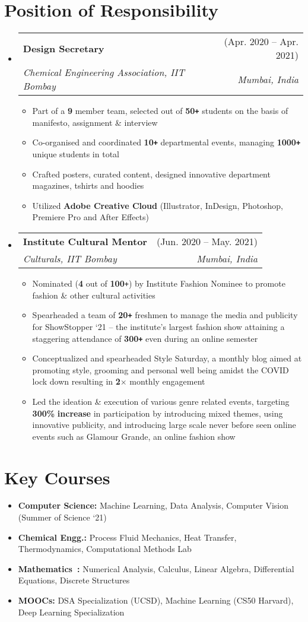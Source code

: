 \documentclass[a4paper,11pt]{article}
\makeatletter
\def\Plus{\texttt{+}}
\newcommand{\techSkill}[2]{\item\small \textbf{#1:} #2 \vspace{-5pt}}
\newcommand{\techSkillListStart}{\begin{itemize}[leftmargin=0.15in, label={}]}
\newcommand{\techSkillListEnd}{\end{itemize}}
\newcommand{\resumeItem}[1]{
  \item\small{
    {#1 \vspace{-2pt}}
  }
}
\newcommand{\resumeSubheading}[4]{
  \vspace{-2pt}\item
    \begin{tabular*}{\textwidth}[t]{l@{\extracolsep{\fill}}r}
      \textbf{#1} & #2 \\
      \textit{\small#3} & \textit{\small #4} \\
    \end{tabular*}\vspace{-7pt}
}
\newcommand{\resumeSubHeadingListStart}{\begin{itemize}[leftmargin=-0pt, label={}]}
\newcommand{\resumeSubHeadingListEnd}{\end{itemize}}
\newcommand{\resumeItemListStart}{\begin{itemize}}
\newcommand{\resumeItemListEnd}{\end{itemize}\vspace{-5pt}}
\makeatother
\begin{document}
\section{Position of Responsibility}
\resumeSubHeadingListStart
  \resumeSubheading
  {Design Secretary}{(Apr. 2020 -- Apr. 2021)}
  {Chemical Engineering Association, IIT Bombay}{Mumbai, India}
  \resumeItemListStart
    \resumeItem{Part of a \textbf{9} member team, selected out of \textbf{50\Plus} students on the basis of manifesto, assignment \& interview}
    \resumeItem{Co-organised and coordinated \textbf{10\Plus} departmental events, managing \textbf{1000\Plus} unique students in total}
    \resumeItem{Crafted posters, curated content, designed innovative department magazines, tshirts and hoodies}
    \resumeItem{Utilized \textbf{Adobe Creative Cloud} (Illustrator, InDesign, Photoshop, Premiere Pro and After Effects)}
  \resumeItemListEnd

  \resumeSubheading
  {Institute Cultural Mentor}{(Jun. 2020 -- May. 2021)}
  {Culturals, IIT Bombay}{Mumbai, India}
  \resumeItemListStart
    \resumeItem{Nominated (\textbf{4} out of \textbf{100}\Plus) by Institute Fashion Nominee to promote fashion \& other cultural activities}
    \resumeItem{Spearheaded a team of \textbf{20\Plus} freshmen to manage the media and publicity for ShowStopper `21 -- the institute's largest fashion show attaining a staggering attendance of \textbf{300\Plus} even during an online semester}
    \resumeItem{Conceptualized and spearheaded Style Saturday, a monthly blog aimed at promoting style, grooming and personal well being amidst the COVID lock down resulting in \textbf{2$\times$} monthly engagement}
    \resumeItem{Led the ideation \& execution of various genre related events, targeting \textbf{300\%} \textbf{increase} in participation by introducing mixed themes, using innovative publicity, and introducing large scale never before seen online events such as Glamour Grande, an online fashion show}
  \resumeItemListEnd
\resumeSubHeadingListEnd


\section{Key Courses}
\techSkillListStart
  \techSkill{Computer Science}{Machine Learning, Data Analysis, Computer Vision (Summer of Science `21)}
  \techSkill{Chemical Engg.}{Process Fluid Mechanics, Heat Transfer, Thermodynamics, Computational Methods Lab}
  \techSkill{Mathematics\ }{Numerical Analysis, Calculus, Linear Algebra, Differential Equations, Discrete Structures}
  \techSkill{MOOCs}{DSA Specialization (UCSD), Machine Learning (CS50 Harvard), Deep Learning Specialization}
\techSkillListEnd
\end{document}
